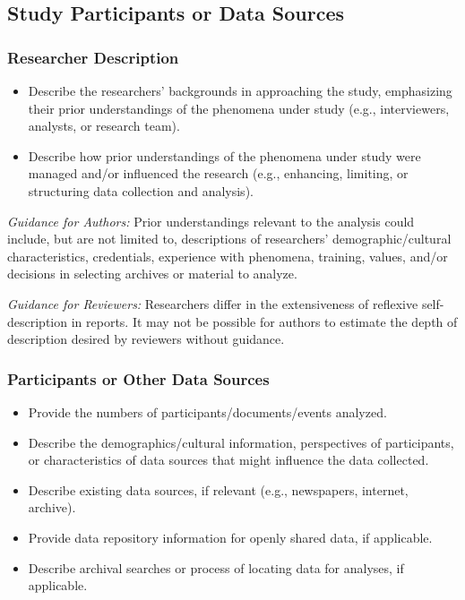 \documentclass[acmsmall]{acmart}
\begin{document}
\subsection{Study Participants or Data Sources}

\subsubsection{Researcher Description}

\begin{itemize}
    \item Describe the researchers’ backgrounds in approaching the study, emphasizing their
prior understandings of the phenomena under study (e.g., interviewers, analysts,
or research team).
\item Describe how prior understandings of the phenomena under study were managed
and/or influenced the research (e.g., enhancing, limiting, or structuring data collection
and analysis).
\end{itemize}

\textit{Guidance for Authors:} Prior understandings relevant to the analysis could include, but are not limited to, descriptions of researchers’ demographic/cultural characteristics, credentials, experience with phenomena, training, values, and/or decisions in selecting archives or material to
analyze.
\vspace{3mm}

\textit{Guidance for Reviewers:} Researchers differ in the extensiveness of reflexive self-description in reports. It may not be possible for authors to estimate the depth of description desired by reviewers
without guidance.

\subsubsection{Participants or Other Data Sources}

\begin{itemize}
    \item Provide the numbers of participants/documents/events analyzed.
\item  Describe the demographics/cultural information, perspectives of participants, or
characteristics of data sources that might influence the data collected.
\item  Describe existing data sources, if relevant (e.g., newspapers, internet, archive).
\item  Provide data repository information for openly shared data, if applicable.
\item  Describe archival searches or process of locating data for analyses, if applicable.
\end{itemize}
\end{document}

